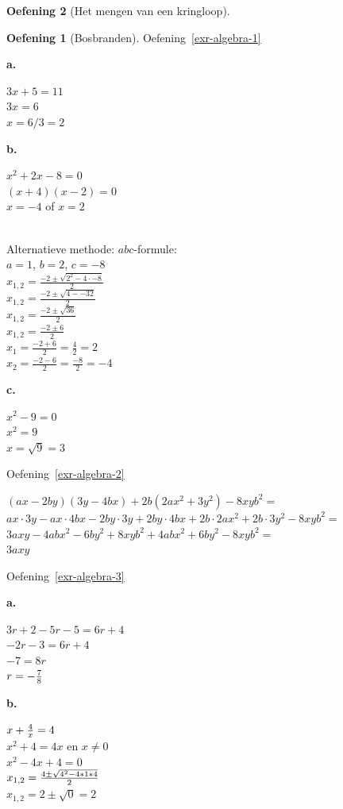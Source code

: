 \documentclass[
  a4paper,
]{scrbook}
\theoremstyle{definition}
\newtheorem{exercise}{Oefening}[chapter]
\theoremstyle{remark}
\begin{document}
\begin{exercise}[Het mengen van een
kringloop]
\begin{exercise}[Bosbranden]

Oefening~\ref{exr-algebra-1}

\textbf{a.}

\(3x + 5 = 11\)\\
\(3x = 6\)\\
\(x = 6/3 = 2\)

\textbf{b.}

\(x^2 + 2x - 8 = 0\)\\
\((x + 4)(x - 2) = 0\)\\
\(x = -4\) of \(x = 2\)\\
\strut \\
Alternatieve methode: \(abc\)-formule:\\
\(a=1\), \(b=2\), \(c=-8\)\\
\(x_{1,2} = \frac{-2 \pm \sqrt{2^2 - 4\cdot-8}}{2}\)\\
\(x_{1,2} = \frac{-2 \pm \sqrt{4 -- 32}}{2}\)\\
\(x_{1,2} = \frac{-2 \pm \sqrt{36}}{2}\)\\
\(x_{1,2} = \frac{-2 \pm 6}{2}\)\\
\(x_{1} = \frac{-2 + 6}{2} = \frac{4}{2} = 2\)\\
\(x_{2} = \frac{-2 - 6}{2} = \frac{-8}{2} = -4\)

\textbf{c.}

\(x^2 - 9 = 0\)\\
\(x^2 = 9\)\\
\(x = \sqrt{9} = 3\)

Oefening~\ref{exr-algebra-2}

\((ax-2by)(3y-4bx)+2b(2ax^2+3y^2)-8xyb^2 =\)\\
\(ax\cdot3y - ax\cdot4bx - 2by\cdot3y + 2by\cdot4bx + 2b\cdot2ax^2 + 2b\cdot3y^2 -8xyb^2 =\)\\
\(3axy - 4abx^2 - 6by^2 + 8xyb^2 + 4abx^2 + 6by^2 - 8xyb^2 =\)\\
\(3axy\)

Oefening~\ref{exr-algebra-3}

\textbf{a.}

\(3r + 2 -5r-5 = 6r+4\)\\
\(-2r-3=6r+4\)\\
\(-7=8r\)\\
\(r=-{7 \over 8}\)

\textbf{b.}

\(x + {4 \over x} =4\)\\
\(x^2+4=4x\) en \(x\neq0\)\\
\(x^2-4x+4=0\)\\
\(x_{1,2}={4 \pm \sqrt{4^2-4*1*4} \over 2}\)\\
\(x_{1,2}=2 \pm \sqrt{0}=2\)


\end{exercise}
\end{exercise}
\end{document}
